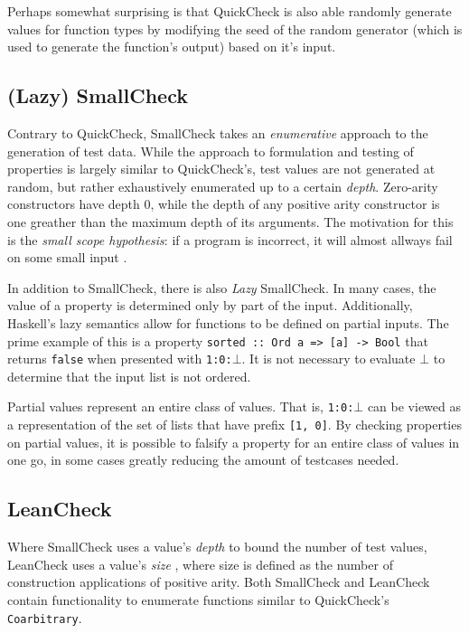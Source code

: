 \documentclass[a4paper,msc,twosized=semi]{uustthesis}
\begin{document}
  Perhaps somewhat surprising is that QuickCheck is also able randomly generate values 
  for function types by modifying the seed of the random generator (which is used to 
  generate the function's output) based on it's input. 

\subsection{(Lazy) SmallCheck} 

  Contrary to QuickCheck, SmallCheck \cite{runciman2008smallcheck} takes an \textit
  {enumerative} approach to the generation of test data. While the approach to 
  formulation and testing of properties is largely similar to QuickCheck's, test 
  values are not generated at random, but rather exhaustively enumerated up to a 
  certain \textit{depth}. Zero-arity constructors have depth $0$, while the depth of 
  any positive arity constructor is one greather than the maximum depth of its 
  arguments. The motivation for this is the \textit{small scope hypothesis}: if a 
  program is incorrect, it will almost allways fail on some small input \cite
  {andoni2003evaluating}. 

  In addition to SmallCheck, there is also \textit{Lazy} SmallCheck. In many cases, 
  the value of a property is determined only by part of the input. Additionally, 
  Haskell's lazy semantics allow for functions to be defined on partial inputs. The 
  prime example of this is a property \texttt{sorted :: Ord a => [a] -> Bool} that 
  returns \texttt{false} when presented with \texttt{1:0:$\bot$}. It is not necessary 
  to evaluate $\bot$ to determine that the input list is not ordered. 

  Partial values represent an entire class of values. That is, \texttt{1:0:$\bot$} can 
  be viewed as a representation of the set of lists that have prefix \texttt{[1, 0]}. 
  By checking properties on partial values, it is possible to falsify a property for 
  an entire class of values in one go, in some cases greatly reducing the amount of 
  testcases needed. 

\subsection{LeanCheck} 

  Where SmallCheck uses a value's \textit{depth} to bound the number of test values, 
  LeanCheck uses a value's \textit{size} \cite{matela2017tools}, where size is defined 
  as the number of construction applications of positive arity. Both SmallCheck and 
  LeanCheck contain functionality to enumerate functions similar to QuickCheck's 
  \texttt{Coarbitrary}. 
\end{document}
